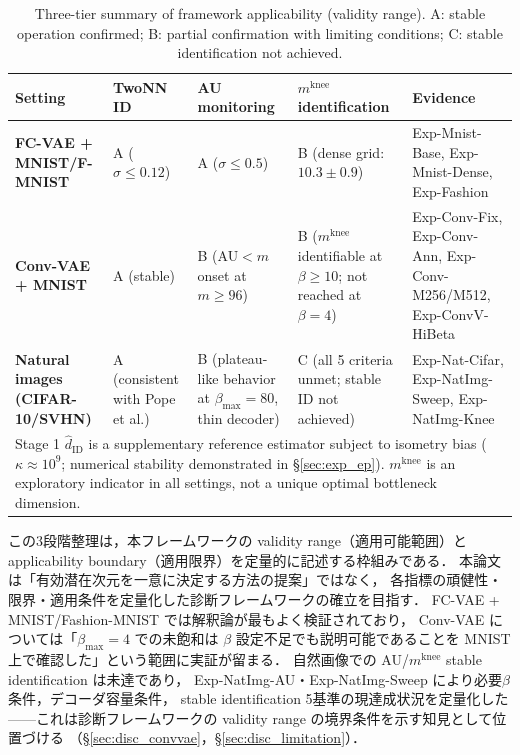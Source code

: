 \documentclass[11pt,a4paper]{jsarticle}
\newcommand{\kap}{\kappa}
\newcommand{\mknee}{m^{\mathrm{knee}}}
\begin{document}
\begin{table}[H]
\centering
\caption{Three-tier summary of framework applicability (validity range). A: stable operation confirmed; B: partial confirmation with limiting conditions; C: stable identification not achieved.}
\label{tab:applicability_tier}
\small
\begin{tabular}{p{3.5cm}p{2.6cm}p{2.4cm}p{2.4cm}p{3.5cm}}
\toprule
Setting & TwoNN ID & AU monitoring & $\mknee$ identification & Evidence \\
\midrule
\textbf{FC-VAE +} \textbf{MNIST/F-MNIST}
  & A ($\sigma\leq0.12$)
  & A ($\sigma\leq0.5$)
  & B (dense grid: $10.3\pm0.9$)
  & Exp-Mnist-Base, Exp-Mnist-Dense, Exp-Fashion \\
\addlinespace
\textbf{Conv-VAE + MNIST}
  & A (stable)
  & B (AU$<m$ onset at $m\geq96$)
  & B ($\mknee$ identifiable at $\beta\geq10$; not reached at $\beta=4$)
  & Exp-Conv-Fix, Exp-Conv-Ann, Exp-Conv-M256/M512, Exp-ConvV-HiBeta \\
\addlinespace
\textbf{Natural images}
\textbf{(CIFAR-10/SVHN)}
  & A (consistent with Pope et al.)
  & B (plateau-like behavior at $\beta_{\max}=80$, thin decoder)
  & C (all 5 criteria unmet; stable ID not achieved)
  & Exp-Nat-Cifar, Exp-NatImg-Sweep, Exp-NatImg-Knee \\
\midrule
\multicolumn{5}{p{14.5cm}}{\small
Stage 1 $\hat{d}_\mathrm{ID}$ is a supplementary reference estimator subject to isometry bias ($\kap\approx10^9$; numerical stability demonstrated in §\ref{sec:exp_ep}). $\mknee$ is an exploratory indicator in all settings, not a unique optimal bottleneck dimension.}\\
\bottomrule
\end{tabular}
\end{table}

この3段階整理は，本フレームワークの validity range（適用可能範囲）と
applicability boundary（適用限界）を定量的に記述する枠組みである．
本論文は「有効潜在次元を一意に決定する方法の提案」ではなく，
各指標の頑健性・限界・適用条件を定量化した診断フレームワークの確立を目指す．
FC-VAE + MNIST/Fashion-MNIST では解釈論が最もよく検証されており，
Conv-VAE については「$\beta_{\max}=4$ での未飽和は $\beta$ 設定不足でも説明可能であることを MNIST 上で確認した」という範囲に実証が留まる．
自然画像での AU/$\mknee$ stable identification は未達であり，
Exp-NatImg-AU・Exp-NatImg-Sweep により必要$\beta$条件，デコーダ容量条件，
stable identification 5基準の現達成状況を定量化した——これは診断フレームワークの
validity range の境界条件を示す知見として位置づける
（§\ref{sec:disc_convvae}，§\ref{sec:disc_limitation}）．
\end{document}
